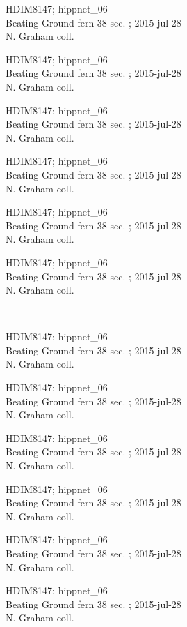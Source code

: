 \documentclass[2pt]{extarticle}
\begin{document}
\noindent
\parbox{0.16\textwidth}{\tiny \raggedright \rule[-0.3\baselineskip]{0pt}{10pt}HDIM8147; hippnet\_06\\ Beating Ground fern 38 sec. ; 2015-jul-28\\ N. Graham coll.}
\parbox{0.16\textwidth}{\tiny \raggedright \rule[-0.3\baselineskip]{0pt}{10pt}HDIM8147; hippnet\_06\\ Beating Ground fern 38 sec. ; 2015-jul-28\\ N. Graham coll.}
\parbox{0.16\textwidth}{\tiny \raggedright \rule[-0.3\baselineskip]{0pt}{10pt}HDIM8147; hippnet\_06\\ Beating Ground fern 38 sec. ; 2015-jul-28\\ N. Graham coll.}
\parbox{0.16\textwidth}{\tiny \raggedright \rule[-0.3\baselineskip]{0pt}{10pt}HDIM8147; hippnet\_06\\ Beating Ground fern 38 sec. ; 2015-jul-28\\ N. Graham coll.}
\parbox{0.16\textwidth}{\tiny \raggedright \rule[-0.3\baselineskip]{0pt}{10pt}HDIM8147; hippnet\_06\\ Beating Ground fern 38 sec. ; 2015-jul-28\\ N. Graham coll.}
\parbox{0.16\textwidth}{\tiny \raggedright \rule[-0.3\baselineskip]{0pt}{10pt}HDIM8147; hippnet\_06\\ Beating Ground fern 38 sec. ; 2015-jul-28\\ N. Graham coll.} \\ 
\vspace{0.001in} 

\noindent
\parbox{0.16\textwidth}{\tiny \raggedright \rule[-0.3\baselineskip]{0pt}{10pt}HDIM8147; hippnet\_06\\ Beating Ground fern 38 sec. ; 2015-jul-28\\ N. Graham coll.}
\parbox{0.16\textwidth}{\tiny \raggedright \rule[-0.3\baselineskip]{0pt}{10pt}HDIM8147; hippnet\_06\\ Beating Ground fern 38 sec. ; 2015-jul-28\\ N. Graham coll.}
\parbox{0.16\textwidth}{\tiny \raggedright \rule[-0.3\baselineskip]{0pt}{10pt}HDIM8147; hippnet\_06\\ Beating Ground fern 38 sec. ; 2015-jul-28\\ N. Graham coll.}
\parbox{0.16\textwidth}{\tiny \raggedright \rule[-0.3\baselineskip]{0pt}{10pt}HDIM8147; hippnet\_06\\ Beating Ground fern 38 sec. ; 2015-jul-28\\ N. Graham coll.}
\parbox{0.16\textwidth}{\tiny \raggedright \rule[-0.3\baselineskip]{0pt}{10pt}HDIM8147; hippnet\_06\\ Beating Ground fern 38 sec. ; 2015-jul-28\\ N. Graham coll.}
\parbox{0.16\textwidth}{\tiny \raggedright \rule[-0.3\baselineskip]{0pt}{10pt}HDIM8147; hippnet\_06\\ Beating Ground fern 38 sec. ; 2015-jul-28\\ N. Graham coll.} \\ 
\vspace{0.001in} 
\end{document}
